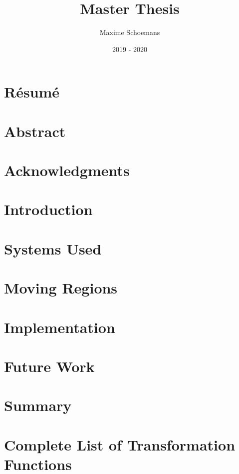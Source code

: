 \documentclass[11pt, twoside]{report}
\title{Master Thesis}
\author{Maxime Schoemans}
\date{2019 - 2020}
\begin{document}

\thispagestyle{empty}

\chapter*{Résumé}

\thispagestyle{empty}

\chapter*{Abstract}

\thispagestyle{empty}
 
\chapter*{Acknowledgments}

\thispagestyle{empty}

\clearpage
{}
\setcounter{page}{1}

\tableofcontents

\listoffigures

\listoftables

\clearpage
{}
\setcounter{page}{1}

\chapter{Introduction}


\chapter{Systems Used}
 

\chapter{Moving Regions}
 

\chapter{Implementation}





\chapter{Future Work}



 
\chapter{Summary}





\appendix

\chapter{Complete List of Transformation Functions}

\end{document}
